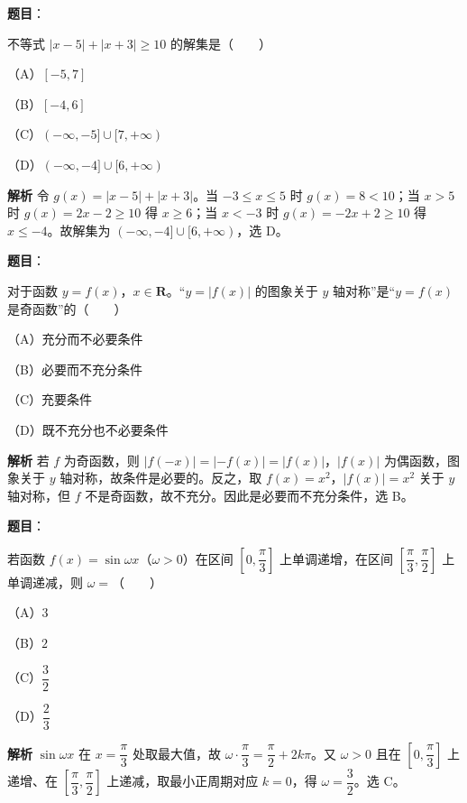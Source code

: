 \begin{answer}

\textbf{题目}：

不等式 $|x-5|+|x+3|\geqslant10$ 的解集是\mbox{（　　）}

（A）$[-5,7]$

（B）$[-4,6]$

（C）$(-\infty,-5]\cup[7,+\infty)$

（D）$(-\infty,-4]\cup[6,+\infty)$

\textbf{解析}
令 $g(x)=|x-5|+|x+3|$。当 $-3\leqslant x\leqslant5$ 时 $g(x)=8<10$；当 $x>5$ 时 $g(x)=2x-2\geqslant10$ 得 $x\geqslant6$；当 $x<-3$ 时 $g(x)=-2x+2\geqslant10$ 得 $x\leqslant-4$。故解集为 $(-\infty,-4]\cup[6,+\infty)$，选 D。


\end{answer}
\begin{answer}

\textbf{题目}：

对于函数 $y=f(x)$，$x\in\mathbf R$。“$y=|f(x)|$ 的图象关于 $y$ 轴对称”是“$y=f(x)$ 是奇函数”的\mbox{（　　）}

（A）充分而不必要条件

（B）必要而不充分条件

（C）充要条件

（D）既不充分也不必要条件

\textbf{解析}
若 $f$ 为奇函数，则 $|f(-x)|=|-f(x)|=|f(x)|$，$|f(x)|$ 为偶函数，图象关于 $y$ 轴对称，故条件是必要的。反之，取 $f(x)=x^2$，$|f(x)|=x^2$ 关于 $y$ 轴对称，但 $f$ 不是奇函数，故不充分。因此是必要而不充分条件，选 B。


\end{answer}
\begin{answer}

\textbf{题目}：

若函数 $f(x)=\sin\omega x$（$\omega>0$）在区间 $\left[0,\dfrac{\pi}{3}\right]$ 上单调递增，在区间 $\left[\dfrac{\pi}{3},\dfrac{\pi}{2}\right]$ 上单调递减，则 $\omega=$\mbox{（　　）}

（A）$3$

（B）$2$

（C）$\dfrac32$

（D）$\dfrac23$

\textbf{解析}
$\sin\omega x$ 在 $x=\dfrac{\pi}{3}$ 处取最大值，故 $\omega\cdot\dfrac\pi3=\dfrac\pi2+2k\pi$。又 $\omega>0$ 且在 $\left[0,\dfrac\pi3\right]$ 上递增、在 $\left[\dfrac\pi3,\dfrac\pi2\right]$ 上递减，取最小正周期对应 $k=0$，得 $\omega=\dfrac32$。选 C。


\end{answer}
